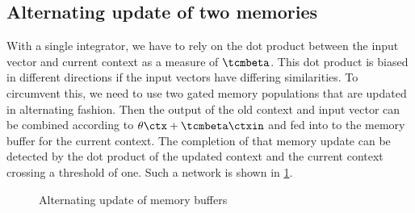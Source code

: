 \subsection{Alternating update of two memories}
With a single integrator, we have to rely on the dot product between the input vector and current context as a measure of $\tcmbeta$.
This dot product is biased in different directions if the input vectors have differing similarities.
To circumvent this, we need to use two gated memory populations that are updated in alternating fashion.
Then the output of the old context and input vector can be combined according to $\theta \ctx + \tcmbeta \ctxin$ and fed into to the memory buffer for the current context.
The completion of that memory update can be detected by the dot product of the updated context and the current context crossing a threshold of one.
Such a network is shown in \cref{fig:ctx-alt-update}.
\begin{figure}
    \centering
    \caption{Alternating update of memory buffers}\label{fig:ctx-alt-update}
\end{figure}

